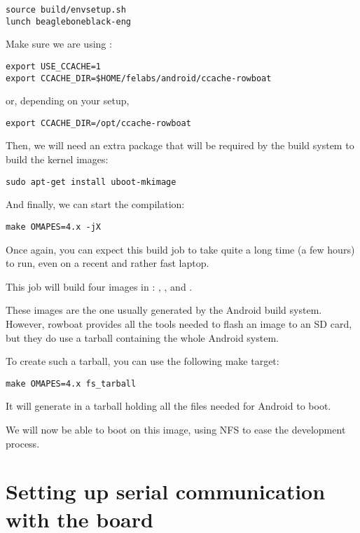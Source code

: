 \begin{verbatim}
source build/envsetup.sh
lunch beagleboneblack-eng
\end{verbatim}

Make sure we are using :

\begin{verbatim}
export USE_CCACHE=1
export CCACHE_DIR=$HOME/felabs/android/ccache-rowboat
\end{verbatim}
or, depending on your setup,
\begin{verbatim}
export CCACHE_DIR=/opt/ccache-rowboat
\end{verbatim}

Then, we will need an extra package that will be required by the build system
to build the kernel images:

\begin{verbatim}
sudo apt-get install uboot-mkimage
\end{verbatim}

And finally, we can start the compilation:

\begin{verbatim}
make OMAPES=4.x -jX
\end{verbatim}

Once again, you can expect this build job to take quite a long time (a
few hours) to run, even on a recent and rather fast laptop.

This job will build four images in
: ,
,  and .

These images are the one usually generated by the Android build
system. However, rowboat provides all the tools needed to flash an
image to an SD card, but they do use a tarball containing the whole
Android system.

To create such a tarball, you can use the following make target:

\begin{verbatim}
make OMAPES=4.x fs_tarball
\end{verbatim}

It will generate in  a
 tarball holding all the files needed for Android
to boot.

We will now be able to boot on this image, using NFS to ease the
development process.

\section{Setting up serial communication with the board}

